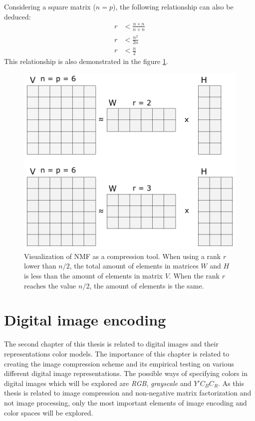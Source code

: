 \documentclass[thesis=M,english]{FITthesis}[2012/10/20]
\begin{document}
Considering a square matrix ($n = p$), the following relationship can also
be deduced:
\begin{align*}
  r &< \frac{n \times n}{n + n}\\
  r &< \frac{n^{2}}{2n}\\
  r &< \frac{n}{2}
\end{align*}
This relationship is also demonstrated in the figure \ref{fig:maxrank}.

\begin{figure}[h]
  \centering
  \caption{Visualization of NMF as a compression tool. When using a rank $r$ lower than $n/2$, the
           total amount of elements in matrices $W$ and $H$ is less than the amount of elements in
           matrix $V$. When the rank $r$ reaches the value $n/2$, the amount of elements is the same.}
  \label{fig:maxrank}
  \includegraphics[scale=0.7]{maxrank}
\end{figure}



\chapter{Digital image encoding}
\label{ch:image-encoding}
The second chapter of this thesis is related to digital images and their
representations color models. The importance of this chapter is related to
creating the image compression scheme and its empirical testing on
various different digital image representations. The possible ways of
specifying colors in digital images which will be explored are \emph{RGB},
\emph{grayscale} and $Y'C_BC_R$. As this thesis is related to image
compression and non-negative matrix factorization and not image processing,
only the most important elements of image encoding and color spaces will be explored.
\end{document}

